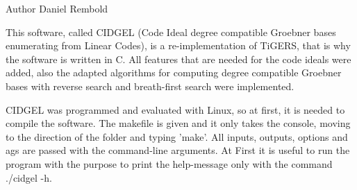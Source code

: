 \begin{DoxyAuthor}{Author}
Daniel Rembold
\end{DoxyAuthor}
This software, called C\-I\-D\-G\-E\-L (Code Ideal degree compatible Groebner bases enumerating from Linear Codes), is a re-\/implementation of Ti\-G\-E\-R\-S, that is why the software is written in C. All features that are needed for the code ideals were added, also the adapted algorithms for computing degree compatible Groebner bases with reverse search and breath-\/first search were implemented.

C\-I\-D\-G\-E\-L was programmed and evaluated with Linux, so at first, it is needed to compile the software. The makefile is given and it only takes the console, moving to the direction of the folder and typing 'make'. All inputs, outputs, options and ags are passed with the command-\/line arguments. At First it is useful to run the program with the purpose to print the help-\/message only with the command ./cidgel -\/h. 